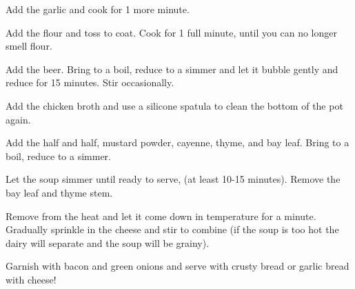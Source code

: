 \begin{recipe}
Add the garlic and cook for 1 more minute.

Add the flour and toss to coat. Cook for 1 full minute, until you can no longer smell flour.

Add the beer. Bring to a boil, reduce to a simmer and let it bubble gently and reduce for 15 minutes. Stir occasionally.

Add the chicken broth and use a silicone spatula to clean the bottom of the pot again.

Add the half and half, mustard powder, cayenne, thyme, and bay leaf. Bring to a boil, reduce to a simmer.

Let the soup simmer until ready to serve, (at least 10-15 minutes). Remove the bay leaf and thyme stem.

Remove from the heat and let it come down in temperature for a minute. Gradually sprinkle in the cheese and stir to combine (if the soup is too hot the dairy will separate and the soup will be grainy).

Garnish with bacon and green onions and serve with crusty bread or garlic bread with cheese!
\end{recipe}

